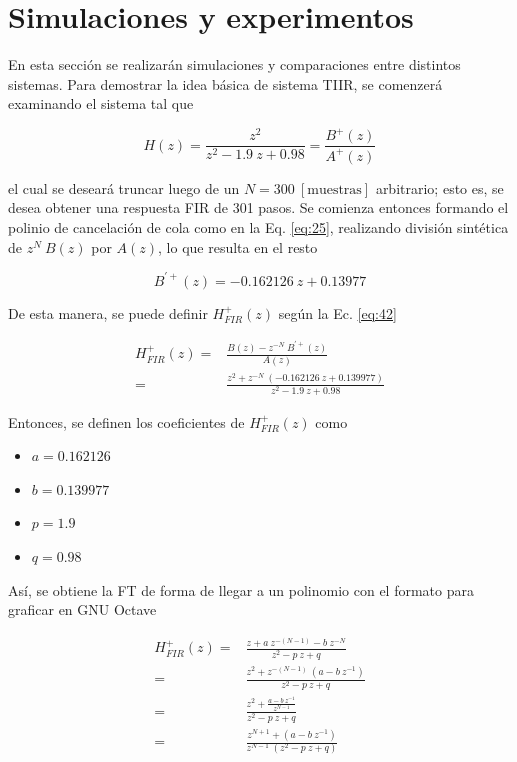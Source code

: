 \message{ !name(../main.tex)}\documentclass[journal,transmag]{IEEEtran}
\begin{document}
\section{Simulaciones y experimentos}
    En esta sección se realizarán simulaciones y comparaciones entre distintos sistemas. Para demostrar la idea básica de sistema TIIR, se comenzerá examinando el sistema tal que

    \begin{equation}
      H(z) = \frac{z^{2}}{z^{2} - 1.9 \: z + 0.98} = \frac{B^{+}(z)}{A^{+}(z)}
    \end{equation}

    el cual se deseará truncar luego de un $N = 300 \: [\text{muestras}]$ arbitrario; esto es, se desea obtener una respuesta FIR de 301 pasos. Se comienza entonces formando el polinio de cancelación de cola como en la Eq. \ref{eq:25}, realizando división sintética de $z^{N} \: B(z)$  por $A(z)$, lo que resulta en el resto

    \begin{equation}
      B^{\prime +}(z) = - 0.162126 \: z + 0.13977
    \end{equation}

    De esta manera, se puede definir $H_{FIR}^{+}(z)$ según la Ec. \ref{eq:42}

    \begin{align}
      H_{FIR}^{+}(z) =& \frac{B(z) - z^{-N} \: B^{\prime + }(z)}{A(z)} \nonumber \\
      =& \frac{z^{2} + z^{-N} \: \left( - 0.162126 \: z + 0.139977 \right)}{z^{2} - 1.9 \: z + 0.98}
    \end{align}

    Entonces, se definen los coeficientes de $H_{FIR}^{+}(z)$  como

    \begin{itemize}
      \item $a = 0.162126$
      \item $b = 0.139977$
      \item $p = 1.9$
      \item $q = 0.98$
    \end{itemize}

    Así, se obtiene la FT de forma de llegar a un polinomio con el formato para graficar en GNU Octave

    \begin{align}
      H_{FIR}^{+}(z) =& \frac{z + a \: z^{-(N-1)} - b \: z^{-N}}{z^{2} - p \: z + q} \nonumber \\
      =& \frac{z^{2} + z^{-(N-1)} \: \left(a - b \: z^{-1} \right)}{z^{2} - p \: z + q} \nonumber \\
      =& \frac{z^{2} + \frac{a - b \: z^{-1}}{z^{N-1}}}{z^{2} - p \: z + q} \nonumber \\
      =& \frac{z^{N+1} + \left( a - b \: z^{-1} \right)}{z^{N-1} \: \left( z^{2} - p \: z + q \right)}
    \end{align}
\end{document}
